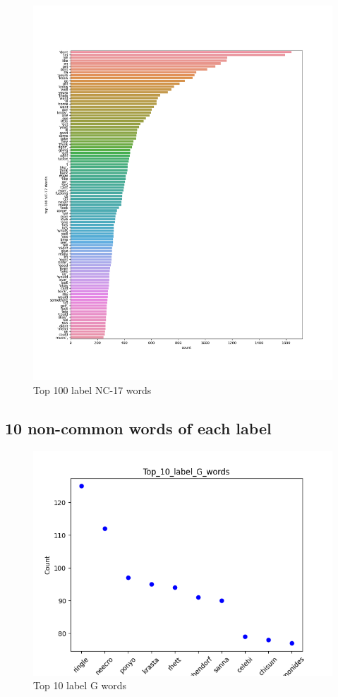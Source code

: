 \documentclass[a4paper]{article}
\begin{document}
\begin{figure}[ht]
    \centering
    \includegraphics[width=1\textwidth]{../stats/top_100_NC-17_words.png}
    \caption{Top 100 label NC-17 words}
\end{figure}

\FloatBarrier

\subsection*{10 non-common words of each label}

\begin{figure}[ht]
    \centering
    \includegraphics[width=1\textwidth]{../stats/Top_10_label_G_words.png}
    \caption{Top 10 label G words}
\end{figure}
\end{document}
